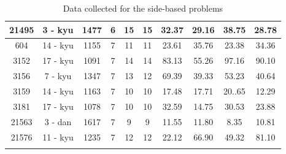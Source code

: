 \documentclass{l4proj}
\begin{document}
\begin{appendices}
\begin{longtable}{|c|c|c|c|c|c|c|c|c|c|}
21495 & 3 - kyu & 1477 & 6 & 15 & 15 & 32.37 & 29.16 & 38.75 & 28.78 \\ \hline
604 & 14 - kyu & 1155 & 7 & 11 & 11 & 23.61 & 35.76 & 23.38 & 34.36 \\ \hline
3152 & 17 - kyu & 1091 & 7 & 14 & 14 & 83.13 & 55.26 & 97.16 & 90.10 \\ \hline
3156 & 7 - kyu & 1347 & 7 & 13 & 12 & 69.39 & 39.33 & 53.23 & 40.64 \\ \hline
3159 & 14 - kyu & 1163 & 7 & 10 & 10 & 17.48 & 17.71 & 20..65 & 12.29 \\ \hline
3181 & 17 - kyu & 1078 & 7 & 10 & 10 & 32.59 & 14.75 & 30.53 & 23.88 \\ \hline
21563 & 3 - dan & 1617 & 7 & 9 & 9 & 11.55 & 11.80 & 8.35 & 10.81 \\ \hline
21576 & 11 - kyu & 1235 & 7 & 12 & 12 & 22.12 & 66.90 & 49.32 & 81.10 \\ \hline
\caption{ Data collected for the side-based problems}
\label{table:data-side}
\end{longtable}




\end{appendices}
\end{document}
